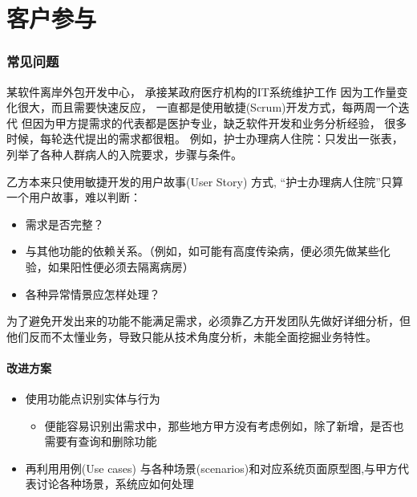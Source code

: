 \chapter{客户参与} %

\hypertarget{ux5e38ux89c1ux95eeux9898}{%
\subsection{常见问题}\label{ux5e38ux89c1ux95eeux9898}}

某软件离岸外包开发中心， 承接某政府医疗机构的IT系统维护工作
因为工作量变化很大，而且需要快速反应，
一直都是使用敏捷(Scrum)开发方式，每两周一个迭代
但因为甲方提需求的代表都是医护专业，缺乏软件开发和业务分析经验，
很多时候，每轮迭代提出的需求都很粗。
例如，护士办理病人住院：只发出一张表，
列举了各种人群病人的入院要求，步骤与条件。

乙方本来只使用敏捷开发的用户故事(User Story) 方式,
``护士办理病人住院''只算一个用户故事，难以判断：

\begin{itemize}
\tightlist
\item
  需求是否完整？
\item
  与其他功能的依赖关系。（例如，如可能有高度传染病，便必须先做某些化验，如果阳性便必须去隔离病房）
\item
  各种异常情景应怎样处理？
\end{itemize}

为了避免开发出来的功能不能满足需求，必须靠乙方开发团队先做好详细分析，但他们反而不太懂业务，导致只能从技术角度分析，未能全面挖掘业务特性。

\hypertarget{ux6539ux8fdbux65b9ux6848}{%
\subsubsection{改进方案}\label{ux6539ux8fdbux65b9ux6848}}

\begin{itemize}
\tightlist
\item
  使用功能点识别实体与行为

  \begin{itemize}
  \tightlist
  \item
    便能容易识别出需求中，那些地方甲方没有考虑例如，除了新增，是否也需要有查询和删除功能
  \end{itemize}
\item
  再利用用例(Use cases)
  与各种场景(scenarios)和对应系统页面原型图,与甲方代表讨论各种场景，系统应如何处理
\end{itemize}

